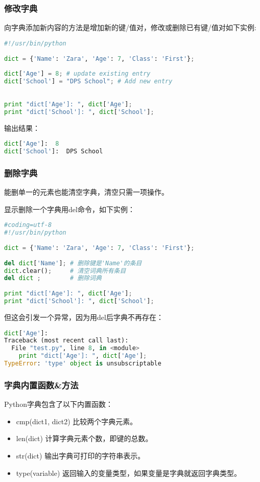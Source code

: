 \subsubsection{修改字典}
向字典添加新内容的方法是增加新的键/值对，修改或删除已有键/值对如下实例:
\begin{lstlisting}[language=Python]
#!/usr/bin/python
 
dict = {'Name': 'Zara', 'Age': 7, 'Class': 'First'};
 
dict['Age'] = 8; # update existing entry
dict['School'] = "DPS School"; # Add new entry
 
 
print "dict['Age']: ", dict['Age'];
print "dict['School']: ", dict['School'];
\end{lstlisting}
输出结果：
\begin{lstlisting}[language=Python]
dict['Age']:  8
dict['School']:  DPS School
\end{lstlisting}


\subsubsection{删除字典}
能删单一的元素也能清空字典，清空只需一项操作。

显示删除一个字典用del命令，如下实例：
\begin{lstlisting}[language=Python]
#coding=utf-8
#!/usr/bin/python
 
dict = {'Name': 'Zara', 'Age': 7, 'Class': 'First'};
 
del dict['Name']; # 删除键是'Name'的条目
dict.clear();     # 清空词典所有条目
del dict ;        # 删除词典
 
print "dict['Age']: ", dict['Age'];
print "dict['School']: ", dict['School'];
\end{lstlisting}
但这会引发一个异常，因为用del后字典不再存在：
\begin{lstlisting}[language=Python]
dict['Age']:
Traceback (most recent call last):
  File "test.py", line 8, in <module>
    print "dict['Age']: ", dict['Age'];
TypeError: 'type' object is unsubscriptable
\end{lstlisting}


\subsubsection{字典内置函数\&方法}
Python字典包含了以下内置函数：
\begin{itemize}
\item 	cmp(dict1, dict2)
比较两个字典元素。
\item len(dict)
计算字典元素个数，即键的总数。
\item	str(dict)
输出字典可打印的字符串表示。
\item	type(variable)
返回输入的变量类型，如果变量是字典就返回字典类型。
\end{itemize}


